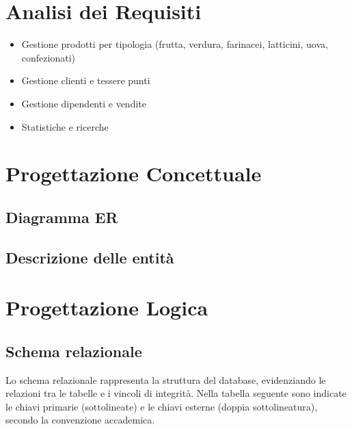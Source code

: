 \documentclass[a4paper,12pt]{article}
\begin{document}
\newpage
\section{Analisi dei Requisiti}
\begin{itemize}
    \item Gestione prodotti per tipologia (frutta, verdura, farinacei, latticini, uova, confezionati)
    \item Gestione clienti e tessere punti
    \item Gestione dipendenti e vendite
    \item Statistiche e ricerche
\end{itemize}

\newpage
\section{Progettazione Concettuale}
\subsection{Diagramma ER}
\begin{center}
\end{center}

\subsection{Descrizione delle entità}

\newpage
\section{Progettazione Logica}

\subsection{Schema relazionale}
\noindent
Lo schema relazionale rappresenta la struttura del database, evidenziando le relazioni tra le tabelle e i vincoli di integrità. Nella tabella seguente sono indicate le chiavi primarie (sottolineate) e le chiavi esterne (doppia sottolineatura), secondo la convenzione accademica.
\end{document}
